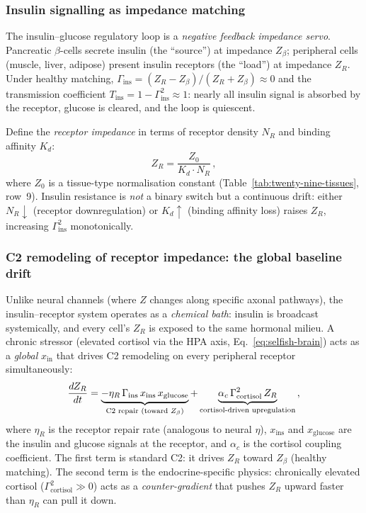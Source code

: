 \documentclass[aps,pre,twocolumn,superscriptaddress,floatfix]{revtex4-2}
\begin{document}
\subsubsection{Insulin signalling as impedance matching}
\label{sec:insulin-impedance}

The insulin--glucose regulatory loop is a
\emph{negative feedback impedance servo}.
Pancreatic $\beta$-cells secrete insulin
(the ``source'') at impedance $Z_\beta$;
peripheral cells (muscle, liver, adipose)
present insulin receptors (the ``load'')
at impedance $Z_R$.
Under healthy matching,
$\Gamma_{\text{ins}} = (Z_R - Z_\beta)/(Z_R + Z_\beta) \approx 0$
and the transmission coefficient
$T_{\text{ins}} = 1 - \Gamma_{\text{ins}}^2 \approx 1$:
nearly all insulin signal is absorbed by the
receptor, glucose is cleared, and the loop
is quiescent.

Define the \emph{receptor impedance} in terms of
receptor density $N_R$ and binding affinity $K_d$:
\begin{equation}
  Z_R = \frac{Z_0}{K_d \cdot N_R}\,,
  \label{eq:z-receptor}
\end{equation}
where $Z_0$ is a tissue-type normalisation constant
(Table~\ref{tab:twenty-nine-tissues}, row~9).
Insulin resistance is \emph{not} a binary switch
but a continuous drift: either $N_R \downarrow$
(receptor downregulation) or $K_d \uparrow$
(binding affinity loss) raises $Z_R$,
increasing $\Gamma_{\text{ins}}^2$ monotonically.

\subsubsection{C2 remodeling of receptor impedance:
  the global baseline drift}
\label{sec:receptor-remodeling}

Unlike neural channels (where $Z$ changes along
specific axonal pathways), the insulin--receptor
system operates as a \emph{chemical bath}:
insulin is broadcast systemically, and every
cell's $Z_R$ is exposed to the same hormonal milieu.
A chronic stressor (elevated cortisol via the HPA
axis, Eq.~\ref{eq:selfish-brain}) acts as a
\emph{global} $x_{\text{in}}$ that drives
C2 remodeling on every peripheral receptor
simultaneously:
\begin{equation}
  \frac{dZ_R}{dt}
  = \underbrace{-\eta_R\,\Gamma_{\text{ins}}
    \,x_{\text{ins}}\,x_{\text{glucose}}}_{%
      \text{C2 repair (toward } Z_\beta\text{)}}
  + \underbrace{\alpha_c\,\Gamma_{\text{cortisol}}^2
    \,Z_R}_{\text{cortisol-driven upregulation}}\,,
  \label{eq:dZR-dt}
\end{equation}
where $\eta_R$ is the receptor repair rate
(analogous to neural $\eta$),
$x_{\text{ins}}$ and $x_{\text{glucose}}$ are
the insulin and glucose signals at the receptor,
and $\alpha_c$ is the cortisol coupling coefficient.
The first term is standard C2:
it drives $Z_R$ toward $Z_\beta$ (healthy matching).
The second term is the endocrine-specific physics:
chronically elevated cortisol
($\Gamma_{\text{cortisol}}^2 \gg 0$) acts as a
\emph{counter-gradient} that pushes $Z_R$ upward
faster than $\eta_R$ can pull it down.
\end{document}
